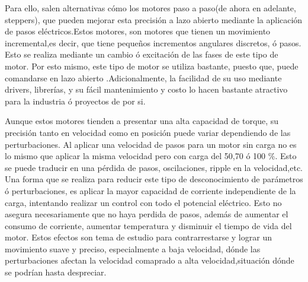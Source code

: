 Para ello, salen alternativas cómo los motores paso a paso(de ahora en adelante, steppers), que pueden mejorar esta precisión a lazo abierto mediante la aplicación de pasos eléctricos.Estos motores, son motores que tienen un movimiento incremental,es decir, que tiene pequeños incrementos angulares discretos, ó pasos. Esto se realiza mediante un cambio ó excitación de las fases de este tipo de motor.
Por esto mismo, este tipo de motor se utiliza bastante, puesto que, puede comandarse en lazo abierto .Adicionalmente, la facilidad de su uso mediante drivers, librerías, y su fácil mantenimiento y costo lo hacen bastante atractivo para la industria ó proyectos de por si.



%
%

Aunque estos motores tienden a presentar una alta capacidad de torque, su precisión tanto en velocidad como en posición puede variar dependiendo de las perturbaciones. Al aplicar una velocidad de pasos para un motor sin carga no es lo mismo que aplicar la misma velocidad pero con carga del 50,70 ó 100 \%.
Esto se puede traducir en una pérdida de pasos, oscilaciones, ripple en la velocidad,etc.
Una forma que se realiza para reducir este tipo de desconocimiento de parámetros ó perturbaciones, es aplicar la mayor capacidad de corriente independiente de la carga, intentando realizar un control con todo el potencial eléctrico. Esto no asegura necesariamente que no haya perdida de pasos, además de aumentar el consumo de corriente, aumentar temperatura y disminuir el tiempo de vida del motor.
Estos efectos son tema de estudio para contrarrestarse y lograr un movimiento suave y preciso, especialmente a baja velocidad, dónde las perturbaciones afectan la velocidad comaprado a alta velocidad,situación dónde se podrían hasta despreciar.


%
%

